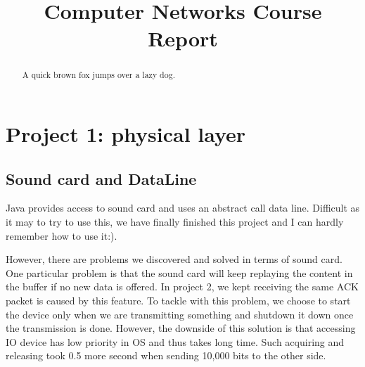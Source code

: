 \documentclass[conference,compsoc]{IEEEtran}
\begin{document}
\title{
	Computer Networks Course Report
}
\author{
\and
}

\maketitle

\begin{abstract}
A quick brown fox jumps over a lazy dog.
\end{abstract}

\section{Project 1: physical layer}
	
	\subsection{Sound card and DataLine}
		Java provides access to sound card and uses an abstract call data line. 
		Difficult as it may to try to use this, we have finally finished this project and I can hardly remember how to use it:).
		\par
		However, there are problems we discovered and solved in terms of sound card.
		One particular problem is that the sound card will keep replaying the content in the buffer if no new data is offered.
		In project 2, we kept receiving the same ACK packet is caused by this feature.
		To tackle with this problem, we choose to start the device only when we are transmitting something and shutdown it down once the transmission is done.
		However, the downside of this solution is that accessing IO device has low priority in OS and thus takes long time. 
		Such acquiring and releasing took 0.5 more second when sending 10,000 bits to the other side.
\end{document}
